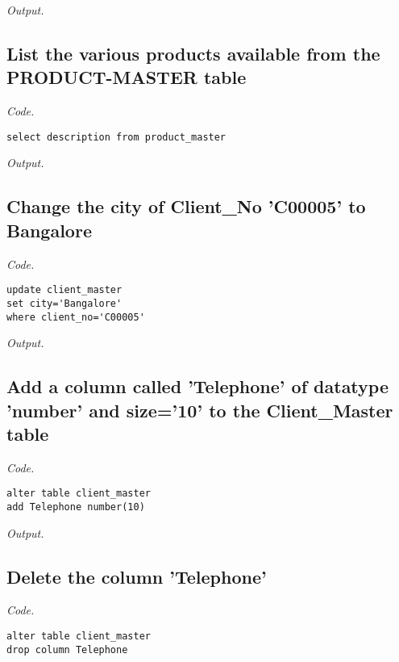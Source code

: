 \documentclass[12pt]{article}
\begin{document}
\textit{Output.}\\

\subsection{List the various products available from the PRODUCT-MASTER table}

\textit{Code.}

\begin{lstlisting}
select description from product_master
\end{lstlisting}

\textit{Output.}\\

\subsection{Change the city of Client\_No 'C00005' to Bangalore}

\textit{Code.}

\begin{lstlisting}
update client_master
set city='Bangalore'
where client_no='C00005'
\end{lstlisting}

\textit{Output.}\\

\subsection{Add a column called 'Telephone' of datatype 'number' and size='10' to the Client\_Master table}

\textit{Code.}

\begin{lstlisting}
alter table client_master
add Telephone number(10)
\end{lstlisting}

\textit{Output.}\\

\subsection{Delete the column 'Telephone'}

\textit{Code.}

\begin{lstlisting}
alter table client_master
drop column Telephone
\end{lstlisting}
\end{document}

